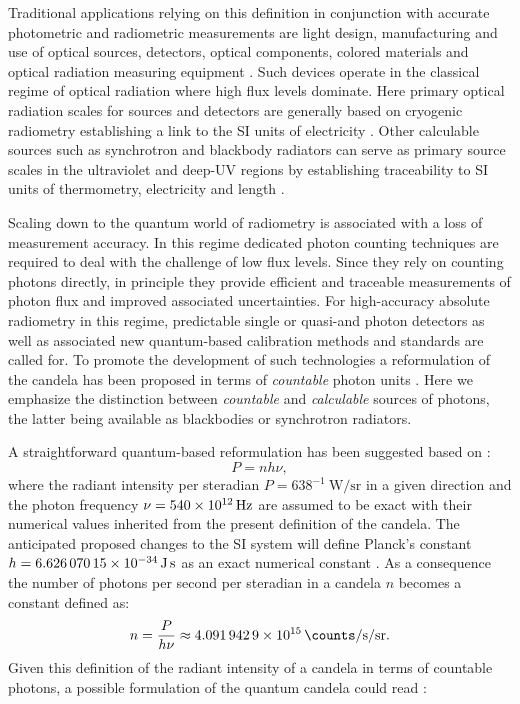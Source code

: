 		Traditional applications relying on this definition in conjunction with accurate photometric and radiometric measurements are light design, manufacturing and use of optical sources, detectors, optical components, colored materials and optical radiation measuring equipment \cite{zwinkels2010photometry}.
		Such devices operate in the classical regime of optical radiation where high flux levels dominate. Here primary optical radiation scales for sources and detectors are generally based on cryogenic radiometry establishing a link to the SI units of electricity \cite{fox20052}. Other calculable sources such as synchrotron and blackbody radiators can serve as primary source scales in the ultraviolet and deep-UV regions by establishing traceability to SI units of thermometry, electricity and length \cite{zwinkels2010photometry, Cheung2007}.

		Scaling down to the quantum world of radiometry is associated with a loss of measurement accuracy. In this regime dedicated photon counting techniques are required to deal with the challenge of low flux levels. Since they rely on counting photons directly, in principle they provide efficient and traceable measurements of photon flux and improved associated uncertainties. For high-accuracy absolute radiometry in this regime, predictable single or quasi-\spss and photon detectors as well as associated new quantum-based calibration methods and standards are called for. To promote the development of such technologies a reformulation of the candela has been proposed in terms of \emph{countable} photon units \cite{zwinkels2010photometry, Cheung2007, SIHighlights2017, QuCandelaProject}. Here we emphasize the distinction between \emph{countable} and \emph{calculable} sources of photons, the latter being available as blackbodies or synchrotron radiators.

		A straightforward quantum-based reformulation has been suggested based on \cite{Cheung2007, zwinkels2010photometry}:
		\begin{equation}
			P = n h \nu,
		\end{equation}
		where the radiant intensity per steradian $P = 638^{-1} \SI{}{\watt\per\steradian}$ in a given direction and the photon frequency $\nu = \SI{540d12}{\hertz}$ are assumed to be exact with their numerical values inherited from the present definition of the candela. The anticipated proposed changes to the SI system will define Planck's constant $h = \SI{6.62607015d-34}{\joule\second}$ as an exact numerical constant \cite{SIproposal}. As a consequence the number of photons per second per steradian in a candela $n$ becomes a constant defined as:
		\begin{equation}
			n = \frac{P}{h \nu} \approx \SI{4.0919429d15}{\counts\per\second\per\steradian}.
		\end{equation}
		Given this definition of the radiant intensity of a candela in terms of countable photons, a possible formulation of the quantum candela could read \cite{Cheung2007}:

